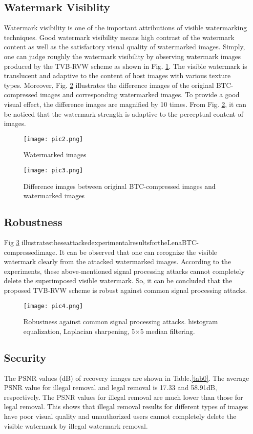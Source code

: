 \documentclass[12pt,a4paper]{article}
\begin{document}
\subsection{Watermark Visiblity}
Watermark visibility is one of the important attributions of visible watermarking techniques. Good watermark visibility means high contrast of the watermark content as well as the satisfactory visual quality of watermarked images. Simply, one can judge roughly the watermark visibility by observing watermark images produced by the TVB-RVW scheme as shown in Fig. \ref{pic2.png}. The visible watermark is translucent and adaptive to the content of host images with various texture types. Moreover, Fig. \ref{pic3.png} illustrates the difference images of the original BTC-compressed images and corresponding watermarked images. To provide a good visual effect, the difference images are magnified by 10 times.
From Fig. \ref{pic3.png}, it can be noticed that the watermark strength is adaptive to the perceptual content of images.
\begin{figure}[!ht]
\centering
\texttt{[image: pic2.png]}
\caption{\label{pic2.png}Watermarked images}
\end{figure}
\begin{figure}[!ht]
\centering
\texttt{[image: pic3.png]}
\caption{\label{pic3.png}Difference images between original BTC-compressed images and watermarked images}
\end{figure}


\subsection{Robustness}
Fig \ref{pic4.png} illustratestheseattackedexperimentalresultsfortheLenaBTC-compressedimage. It can be observed that one can recognize the visible watermark clearly from the attacked watermarked images. According to the experiments, these above-mentioned signal processing attacks cannot completely delete the superimposed visible watermark. So, it can be concluded that the proposed TVB-RVW scheme is robust against common signal processing attacks.

\begin{figure}[!ht]
\centering
\texttt{[image: pic4.png]}
\caption{\label{pic4.png}Robustness against common signal processing attacks. histogram equalization, Laplacian sharpening, 5×5 median filtering.}
\end{figure}

\subsection{Security}
The PSNR values (dB) of recovery images are shown in Table.\ref{tab0}. The average PSNR value for illegal removal and legal removal is 17.33 and 58.91dB, respectively. The PSNR values for illegal removal are much lower than those for legal removal. This shows that illegal removal results for different types of images have poor visual quality and unauthorized users cannot completely delete the visible watermark by illegal watermark removal.
\end{document}
